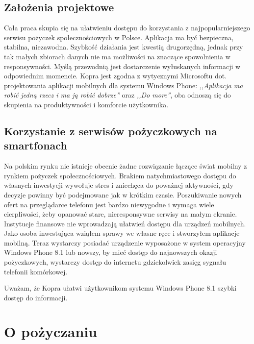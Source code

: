 \documentclass[a4paper,twoside,titlepage,openright]{book}
\begin{document}
\section*{Założenia projektowe}

Cała praca skupia się na ułatwieniu dostępu do korzystania z najpopularniejszego serwisu pożyczek społecznościowych w Polsce. Aplikacja ma być bezpieczna, stabilna, niezawodna. Szybkość działania jest kwestią drugorzędną, jednak przy tak małych zbiorach danych nie ma możliwości na znaczące spowolnienia w responsywności. Myślą przewodnią jest dostarczenie wyłuskanych informacji w odpowiednim momencie. Kopra jest zgodna z wytycznymi Microsoftu dot. projektowania aplikacji mobilnych dla systemu Windows Phone: \textit{,,Aplikacja ma robić jedną rzecz i ma ją robić dobrze''}\cite{wpDesign} oraz \textit{,,Do more''}\cite{doMore}, oba odnoszą się do skupienia na produktywności i komforcie użytkownika. 

\section*{Korzystanie z serwisów pożyczkowych na smartfonach}

Na polskim rynku nie istnieje obecnie żadne rozwiązanie łączące świat mobilny z rynkiem pożyczek społecznościowych. Brakiem natychmiastowego dostępu do własnych inwestycji wywołuje stres i zniechęca do poważnej aktywności, gdy decyzje powinny być podejmowane jak w krótkim czasie. Poszukiwanie nowych ofert na przeglądarce telefonu jest bardzo niewygodne i wymaga wiele cierpliwości, żeby opanować stare, nieresponsywne serwisy na małym ekranie. Instytucje finansowe nie wprowadzają ułatwień dostępu dla urządzeń mobilnych. Jako osoba inwestująca wziąłem sprawy we własne ręce i stworzyłem aplikacje mobilną. Teraz wystarczy posiadać urządzenie wyposażone w system operacyjny Windows Phone 8.1 lub nowszy, by mieć dostęp do najnowszych okazji pożyczkowych, wystarczy dostęp do internetu gdziekolwiek zasięg sygnału telefonii komórkowej. 

Uważam, że Kopra ułatwi użytkownikom systemu Windows Phone 8.1 szybki dostęp do informacji.




\clearpage{\pagestyle{empty}\cleardoublepage}
\chapter{O pożyczaniu}
\end{document}
